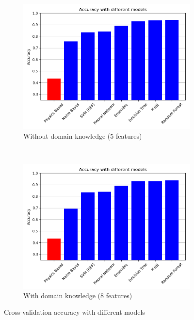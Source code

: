 \documentclass{article}
\begin{document}
\begin{figure}[h!]
    \centering
    \begin{subfigure}[b]{0.45\textwidth}
        \includegraphics[width=\textwidth]{../figures/wo_domain_knowledge/accuracy_compilation.png}
        \caption{Without domain knowledge (5  features)}
        \label{fig:gull}
    \end{subfigure}
    ~ %
    \begin{subfigure}[b]{0.45\textwidth}
        \includegraphics[width=\textwidth]{../figures/w_domain_knowledge/accuracy_compilation.png}
        \caption{With domain knowledge (8  features)}
        \label{fig:tiger}
    \end{subfigure}
    \caption{Cross-validation accuracy with different models}\label{fig:tuned}
\end{figure}
\end{document}
